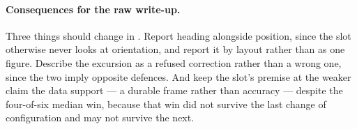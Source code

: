 \documentclass[11pt,a4paper,notitlepage]{report}
\begin{document}
\paragraph{Consequences for the raw write-up.} Three things should change in
. Report heading alongside position, since the slot
otherwise never looks at orientation, and report it by layout rather than as one
figure. Describe the excursion as a refused correction rather than a wrong one,
since the two imply opposite defences. And keep the slot's premise at the weaker
claim the data support --- a durable frame rather than accuracy --- despite the
four-of-six median win, because that win did not survive the last change of
configuration and may not survive the next.
\end{document}
